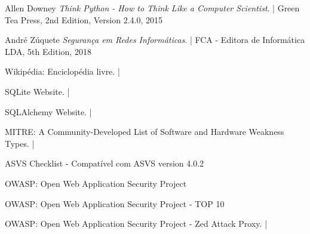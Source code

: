 %
%
\begin{thebibliography}{9}

Allen Downey
\textit{Think Python - How to Think Like a Computer Scientist}. |
Green Tea Press, 2nd Edition, Version 2.4.0, 2015

André Zúquete
\textit{Segurança em Redes Informáticas}. |
FCA - Editora de Informática LDA, 5th Edition, 2018

Wikipédia: Enciclopédia livre. |

SQLite Website. |

SQLAlchemy Website. |

MITRE: A Community-Developed List of Software and Hardware Weakness Types. |

ASVS Checklist - Compatível com ASVS version 4.0.2

OWASP: Open Web Application Security Project

OWASP: Open Web Application Security Project - TOP 10 

OWASP: Open Web Application Security Project - Zed Attack Proxy. |



\end{thebibliography}
